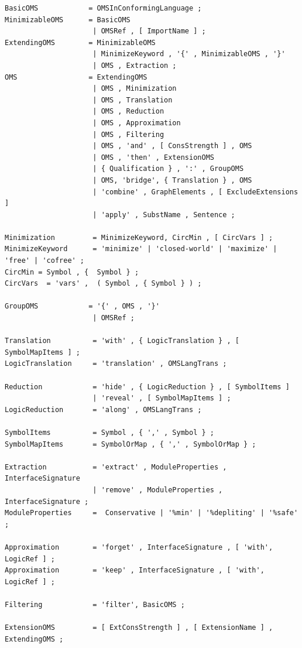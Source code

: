 \documentclass[10pt,%
\ifpretendfinal
final%
\else
draft%
\fi,
]{scrreprt}
\begin{document}
\begin{lstlisting}[language=ebnf,escapeinside={<>},mathescape]
BasicOMS            = OMSInConformingLanguage ;
MinimizableOMS      = BasicOMS
                     | OMSRef , [ ImportName ] ; 
ExtendingOMS        = MinimizableOMS
                     | MinimizeKeyword , '{' , MinimizableOMS , '}' 
                     | OMS , Extraction ;
OMS                 = ExtendingOMS
                     | OMS , Minimization 
                     | OMS , Translation
                     | OMS , Reduction
                     | OMS , Approximation
                     | OMS , Filtering
                     | OMS , 'and' , [ ConsStrength ] , OMS 
                     | OMS , 'then' , ExtensionOMS
                     | { Qualification } , ':' , GroupOMS
                     | OMS, 'bridge', { Translation } , OMS 
                     | 'combine' , GraphElements , [ ExcludeExtensions ]  
                     | 'apply' , SubstName , Sentence ;

Minimization         = MinimizeKeyword, CircMin , [ CircVars ] ;
MinimizeKeyword      = 'minimize' | 'closed-world' | 'maximize' | 'free' | 'cofree' ;
CircMin = Symbol , {  Symbol } ;
CircVars  = 'vars' ,  ( Symbol , { Symbol } ) ;

GroupOMS            = '{' , OMS , '}'
                     | OMSRef ;

Translation          = 'with' , { LogicTranslation } , [ SymbolMapItems ] ;
LogicTranslation     = 'translation' , OMSLangTrans ;
                      
Reduction            = 'hide' , { LogicReduction } , [ SymbolItems ]
                     | 'reveal' , [ SymbolMapItems ] ;
LogicReduction       = 'along' , OMSLangTrans ;

SymbolItems          = Symbol , { ',' , Symbol } ;
SymbolMapItems       = SymbolOrMap , { ',' , SymbolOrMap } ;

Extraction           = 'extract' , ModuleProperties , InterfaceSignature
                     | 'remove' , ModuleProperties , InterfaceSignature ;
ModuleProperties     =  Conservative | '%min' | '%depliting' | '%safe' ; 

Approximation        = 'forget' , InterfaceSignature , [ 'with', LogicRef ] ;
Approximation        = 'keep' , InterfaceSignature , [ 'with', LogicRef ] ;

Filtering            = 'filter', BasicOMS ;

ExtensionOMS         = [ ExtConsStrength ] , [ ExtensionName ] , ExtendingOMS ;


\end{lstlisting}
\end{document}
